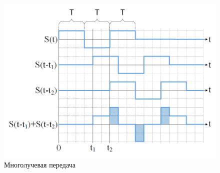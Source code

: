 \begin{figure}[hp]
	\centering
	\includegraphics[width=1\linewidth]{AfanasyevMM/img/time_scheme}
	\caption{Многолучевая передача}
	\label{fig:AfanasyevMM.time_scheme}
\end{figure}